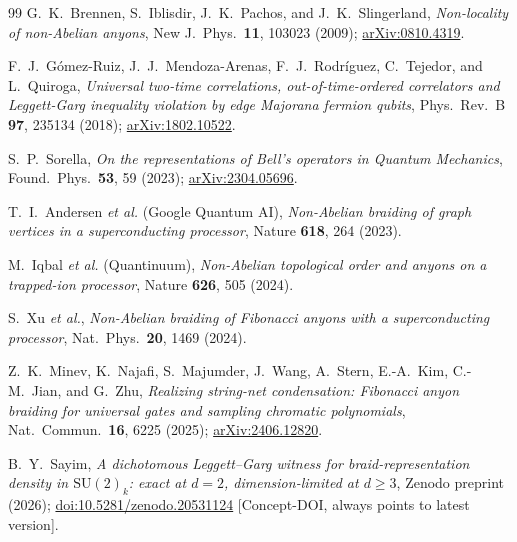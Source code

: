\documentclass[aps,prx,reprint,amsmath,amssymb,floatfix,nofootinbib,superscriptaddress]{revtex4-2}
\begin{document}
\begin{thebibliography}{99}
G.~K.~Brennen, S.~Iblisdir, J.~K.~Pachos, and J.~K.~Slingerland,
\emph{Non-locality of non-Abelian anyons},
New J.\ Phys.\ \textbf{11}, 103023 (2009);
\href{https://arxiv.org/abs/0810.4319}{arXiv:0810.4319}.

F.~J.~G\'omez-Ruiz, J.~J.~Mendoza-Arenas, F.~J.~Rodr\'iguez,
C.~Tejedor, and L.~Quiroga,
\emph{Universal two-time correlations, out-of-time-ordered
correlators and Leggett-Garg inequality violation by edge Majorana
fermion qubits},
Phys.\ Rev.\ B \textbf{97}, 235134 (2018);
\href{https://arxiv.org/abs/1802.10522}{arXiv:1802.10522}.

S.~P.~Sorella,
\emph{On the representations of Bell's operators in Quantum Mechanics},
Found.\ Phys.\ \textbf{53}, 59 (2023);
\href{https://arxiv.org/abs/2304.05696}{arXiv:2304.05696}.

T.~I.~Andersen \emph{et al.} (Google Quantum AI),
\emph{Non-Abelian braiding of graph vertices in a superconducting processor},
Nature \textbf{618}, 264 (2023).

M.~Iqbal \emph{et al.} (Quantinuum),
\emph{Non-Abelian topological order and anyons on a trapped-ion processor},
Nature \textbf{626}, 505 (2024).

S.~Xu \emph{et al.},
\emph{Non-Abelian braiding of Fibonacci anyons with a superconducting processor},
Nat.\ Phys.\ \textbf{20}, 1469 (2024).

Z.~K.~Minev, K.~Najafi, S.~Majumder, J.~Wang, A.~Stern,
E.-A.~Kim, C.-M.~Jian, and G.~Zhu,
\emph{Realizing string-net condensation: Fibonacci anyon braiding
for universal gates and sampling chromatic polynomials},
Nat.\ Commun.\ \textbf{16}, 6225 (2025);
\href{https://arxiv.org/abs/2406.12820}{arXiv:2406.12820}.

B.~Y.~Sayim,
\emph{A dichotomous Leggett--Garg witness for braid-representation
density in $\mathrm{SU}(2)_k$: exact at $d=2$, dimension-limited at
$d \ge 3$},
Zenodo preprint (2026);
\href{https://doi.org/10.5281/zenodo.20531124}{doi:10.5281/zenodo.20531124}
[Concept-DOI, always points to latest version].

\end{thebibliography}
\end{document}
